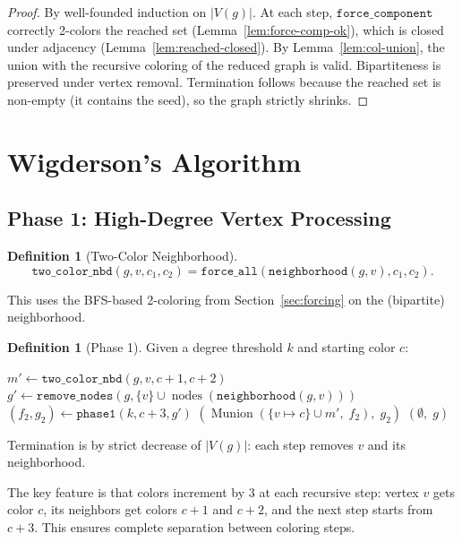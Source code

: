 \documentclass[11pt]{article}
\theoremstyle{plain}
\theoremstyle{definition}
\newtheorem{definition}[theorem]{Definition}
\theoremstyle{remark}
\newcommand{\nodes}{\operatorname{nodes}}
\newcommand{\Munion}{\operatorname{Munion}}
\newcommand{\degree}{\operatorname{deg}}
\begin{document}
\begin{proof}
By well-founded induction on $|V(g)|$. At each step, $\texttt{force\_component}$ correctly 2-colors the reached set (Lemma~\ref{lem:force-comp-ok}), which is closed under adjacency (Lemma~\ref{lem:reached-closed}). By Lemma~\ref{lem:col-union}, the union with the recursive coloring of the reduced graph is valid. Bipartiteness is preserved under vertex removal. Termination follows because the reached set is non-empty (it contains the seed), so the graph strictly shrinks.
\end{proof}

\section{Wigderson's Algorithm}
\label{sec:wigderson}

\subsection{Phase 1: High-Degree Vertex Processing}

\begin{definition}[Two-Color Neighborhood]
\[
  \texttt{two\_color\_nbd}(g, v, c_1, c_2) = \texttt{force\_all}(\texttt{neighborhood}(g, v), c_1, c_2).
\]
\end{definition}

This uses the BFS-based 2-coloring from Section~\ref{sec:forcing} on the (bipartite) neighborhood.

\begin{definition}[Phase 1]
Given a degree threshold $k$ and starting color $c$:
\begin{algorithmic}[1]
  \If{$\exists v \in g$ with $\degree(v, g) > k$}
    \State $m' \gets \texttt{two\_color\_nbd}(g, v, c{+}1, c{+}2)$
    \State $g' \gets \texttt{remove\_nodes}(g, \{v\} \cup \nodes(\texttt{neighborhood}(g, v)))$
    \State $(f_2, g_2) \gets \texttt{phase1}(k, c{+}3, g')$
    \State \Return $(\Munion(\{v \mapsto c\} \cup m',\; f_2),\; g_2)$
  \Else
    \State \Return $(\emptyset,\; g)$
  \EndIf
\EndFunction
\end{algorithmic}
Termination is by strict decrease of $|V(g)|$: each step removes $v$ and its neighborhood.
\end{definition}

The key feature is that colors increment by 3 at each recursive step: vertex $v$ gets color $c$, its neighbors get colors $c{+}1$ and $c{+}2$, and the next step starts from $c{+}3$. This ensures complete separation between coloring steps.
\end{document}

